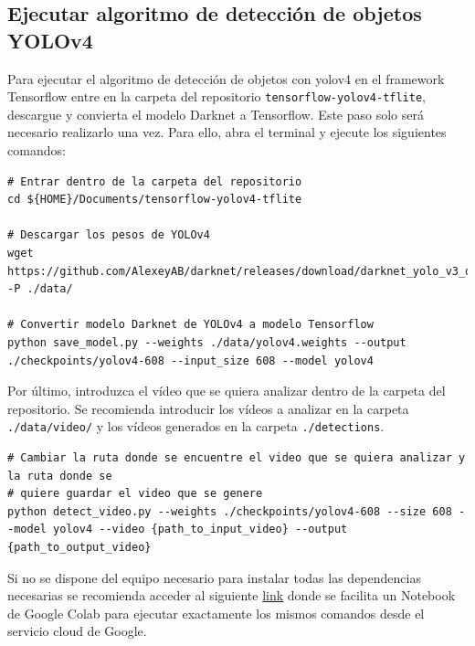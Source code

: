 \subsection{Ejecutar algoritmo de detección de objetos YOLOv4}
\label{subsec:ejecutar-deteccion-yolov4}

Para ejecutar el algoritmo de detección de objetos con \gls{yolov4} en el framework Tensorflow entre en la carpeta del repositorio \texttt{tensorflow-yolov4-tflite}, descargue y convierta el modelo Darknet a Tensorflow. Este paso solo será necesario realizarlo una vez. Para ello, abra el terminal y ejecute los siguientes comandos:

\vspace{0.5cm}
\begin{lstlisting}[language=iPython,caption=Descarga de pesos y conversion modelo YOLOv4,captionpos=b,label={lst:descarga-weights-convertir-modelo}]
# Entrar dentro de la carpeta del repositorio
cd ${HOME}/Documents/tensorflow-yolov4-tflite

# Descargar los pesos de YOLOv4
wget https://github.com/AlexeyAB/darknet/releases/download/darknet_yolo_v3_optimal/yolov4.weights -P ./data/

# Convertir modelo Darknet de YOLOv4 a modelo Tensorflow
python save_model.py --weights ./data/yolov4.weights --output ./checkpoints/yolov4-608 --input_size 608 --model yolov4
\end{lstlisting}

Por último, introduzca el vídeo que se quiera analizar dentro de la carpeta del repositorio. Se recomienda introducir los vídeos a analizar en la carpeta \texttt{./data/video/} y los vídeos generados en la carpeta \texttt{./detections}.

\vspace{0.5cm}
\begin{lstlisting}[language=iPython,caption=Ejecutar script detección de objetos con YOLOv4 en Tensorflow,captionpos=b,label={lst:ejecutar-yolov4-tf}]
# Cambiar la ruta donde se encuentre el video que se quiera analizar y la ruta donde se
# quiere guardar el video que se genere
python detect_video.py --weights ./checkpoints/yolov4-608 --size 608 --model yolov4 --video {path_to_input_video} --output {path_to_output_video}
\end{lstlisting}

Si no se dispone del equipo necesario para instalar todas las dependencias necesarias se recomienda acceder al siguiente \href{https://colab.research.google.com/drive/1ZwcfV2hFZKcsyXaqKp9AGuEi5TY-QwVW?usp=sharing}{link} donde se facilita un Notebook de Google Colab para ejecutar exactamente los mismos comandos desde el servicio cloud de Google.

